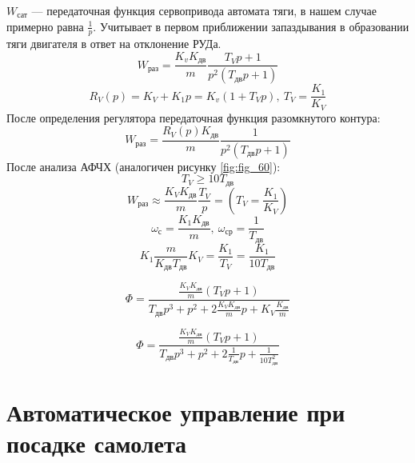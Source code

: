 \documentclass{article}
\begin{document}
$W_\text{сат}$ --- передаточная функция сервопривода автомата тяги, в нашем
случае примерно равна $\frac{1}{p}$.
Учитывает в первом приближении запаздывания в образовании тяги двигателя в
ответ на отклонение РУДа.
\[
	W_\text{раз} = \frac{K_v K_\text{дв}}{m} \frac{T_V p + 1}{p^2(T_\text{дв}p
		+1)}
\]
\[
	R_V(p) = K_V + K_1 p = K_v (1 + T_V p), \ T_V = \frac{K_1}{K_V}
\]
После определения регулятора передаточная функция разомкнутого контура:
\[
	W_\text{раз} = \frac{R_V(p) K_\text{дв}}{m} \frac{1}{p^2(T_\text{дв}p +1)}
\]
После анализа АФЧХ (аналогичен рисунку \ref{fig:fig_60}):
\[
	T_V \ge 10 T_\text{дв}
\]
\[
	W_\text{раз} \approx \frac{K_V K_ \text{дв}}{m}\frac{T_V}{p}  = \left( T_V
	= \frac{K_1}{K_V} \right)
\]
\[
	\omega_\text{с} = \frac{K_1 K_\text{дв}}{m}, \ \omega_\text{ср} =
	\frac{1}{T_\text{дв}}
\]
\[
	K_1 \frac{m}{K_\text{дв} T_\text{дв}} K_V = \frac{K_1}{T_V} = \frac{K_1}{10
		T_\text{дв}}
\]

\[
	\Phi = \frac{\frac{K_V K_\text{дв}}{m}(T_V p + 1)}{T_\text{дв} p^3 + p^2 +
		2 \frac{K_V K_\text{дв}}{m}p + K_V \frac{K_\text{дв}}{m}}
\]

\[
	\Phi = \frac{\frac{K_V K_\text{дв}}{m}(T_V p + 1)}{ T_\text{дв}p^3 + p^2 +
		2 \frac{1}{T_\text{дв}}p + \frac{1}{10 T_\text{дв}^2}}
\]

\section{Автоматическое управление при посадке самолета}
\end{document}
